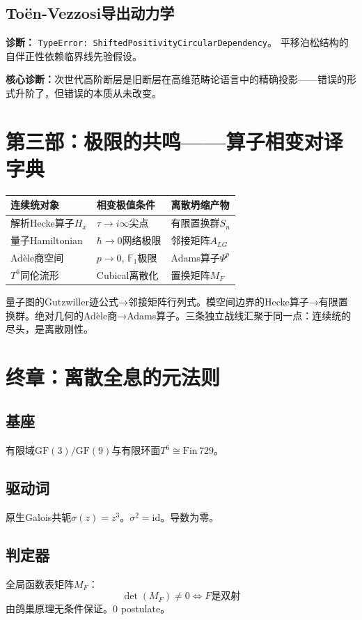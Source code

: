 \documentclass{article}
\begin{document}
\subsection{Toën-Vezzosi导出动力学}
\textbf{诊断：} \texttt{TypeError: ShiftedPositivityCircularDependency}。
平移泊松结构的自伴正性依赖临界线先验假设。

\textbf{核心诊断：}次世代高阶断层是旧断层在高维范畴论语言中的精确投影——错误的形式升阶了，但错误的本质从未改变。

\section{第三部：极限的共鸣——算子相变对译字典}

\begin{center}
\begin{tabular}{lll}
连续统对象 & 相变极值条件 & 离散坍缩产物 \\
\hline
解析Hecke算子$H_x$ & $\tau\to i\infty$尖点 & 有限置换群$S_n$ \\
量子Hamiltonian & $\hbar\to 0$网络极限 & 邻接矩阵$A_{LG}$ \\
Adèle商空间 & $p\to0$, $\mathbb{F}_1$极限 & Adams算子$\Psi^p$ \\
$T^6$同伦流形 & Cubical离散化 & 置换矩阵$M_F$
\end{tabular}
\end{center}

量子图的Gutzwiller迹公式→邻接矩阵行列式。模空间边界的Hecke算子→有限置换群。绝对几何的Adèle商→Adams算子。三条独立战线汇聚于同一点：连续统的尽头，是离散刚性。

\section{终章：离散全息的元法则}

\subsection{基座}
有限域$\mathrm{GF}(3)/\mathrm{GF}(9)$与有限环面$T^6\cong\mathrm{Fin}\,729$。

\subsection{驱动词}
原生Galois共轭$\sigma(z)=z^3$。$\sigma^2=\mathrm{id}$。导数为零。

\subsection{判定器}
全局函数表矩阵$M_F$：
\[\det(M_F)\neq 0 \iff F\text{是双射}\]
由鸽巢原理无条件保证。0 postulate。
\end{document}
